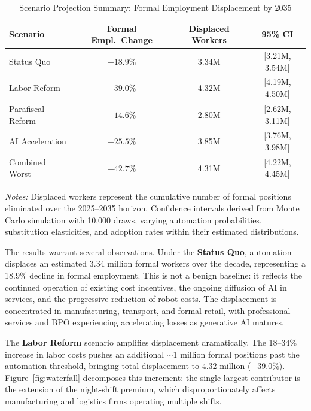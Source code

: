 \begin{table}[H]
\centering
\caption{Scenario Projection Summary: Formal Employment Displacement by 2035}
\label{tab:scenarios}
\begin{threeparttable}
\begin{tabular}{lccc}
\toprule
\textbf{Scenario} & \textbf{Formal Empl.\ Change} & \textbf{Displaced Workers} & \textbf{95\% CI} \\
\midrule
Status Quo & $-18.9\%$ & 3.34M & [3.21M, 3.54M] \\
Labor Reform & $-39.0\%$ & 4.32M & [4.19M, 4.50M] \\
Parafiscal Reform & $-14.6\%$ & 2.80M & [2.62M, 3.11M] \\
AI Acceleration & $-25.5\%$ & 3.85M & [3.76M, 3.98M] \\
Combined Worst & $-42.7\%$ & 4.31M & [4.22M, 4.45M] \\
\bottomrule
\end{tabular}
\begin{tablenotes}
\small
\item \textit{Notes:} Displaced workers represent the cumulative number of formal positions eliminated over the 2025--2035 horizon. Confidence intervals derived from Monte Carlo simulation with 10,000 draws, varying automation probabilities, substitution elasticities, and adoption rates within their estimated distributions.
\end{tablenotes}
\end{threeparttable}
\end{table}

The results warrant several observations. Under the \textbf{Status Quo}, automation displaces an estimated 3.34 million formal workers over the decade, representing a 18.9\% decline in formal employment. This is not a benign baseline: it reflects the continued operation of existing cost incentives, the ongoing diffusion of AI in services, and the progressive reduction of robot costs. The displacement is concentrated in manufacturing, transport, and formal retail, with professional services and BPO experiencing accelerating losses as generative AI matures.

The \textbf{Labor Reform} scenario amplifies displacement dramatically. The 18--34\% increase in labor costs pushes an additional $\sim$1 million formal positions past the automation threshold, bringing total displacement to 4.32 million ($-39.0\%$). Figure~\ref{fig:waterfall} decomposes this increment: the single largest contributor is the extension of the night-shift premium, which disproportionately affects manufacturing and logistics firms operating multiple shifts.


